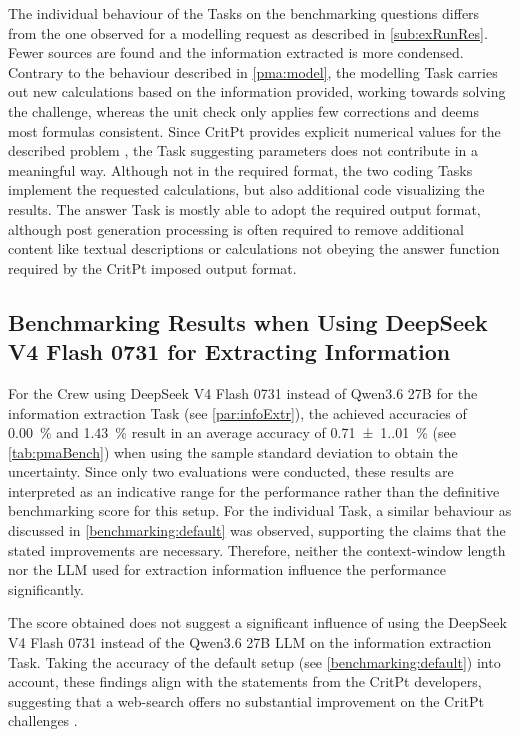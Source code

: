 \documentclass[
	fontsize = 11pt,
	paper = a4,
	draft = false,
	twoside = true,
	titlepage = false
]{scrartcl}
\numberwithin{equation}{subsection}
\begin{document}
	The individual behaviour of the Tasks on the benchmarking questions differs from the one observed for a modelling request as described in \autoref{sub:exRunRes}. Fewer sources are found and the information extracted is more condensed. Contrary to the behaviour described in \autoref{pma:model}, the modelling Task carries out new calculations based on the information provided, working towards solving the challenge, whereas the unit check only applies few corrections and deems most formulas consistent. Since CritPt provides explicit numerical values for the described problem \autocite{critptGit}, the Task suggesting parameters does not contribute in a meaningful way. Although not in the required format, the two coding Tasks implement the requested calculations, but also additional code visualizing the results. The answer Task is mostly able to adopt the required output format, although post generation processing is often required to remove additional content like textual descriptions or calculations not obeying the answer function required by the CritPt imposed output format.
	
	\subsection{Benchmarking Results when Using DeepSeek V4 Flash 0731 for Extracting Information} \label{benchmarking:deep1}
	For the Crew using DeepSeek V4 Flash 0731 instead of Qwen3.6 27B for the information extraction Task (see \autoref{par:infoExtr}), the achieved accuracies of \SI[round-mode=places, round-precision=2]{0.00}{\percent} and \SI[round-mode=places, round-precision=2]{1.43}{\percent} result in an average accuracy of \SI[round-mode=places, round-precision=2]{0.71(1.01)}{\percent} (see \autoref{tab:pmaBench}) when using the sample standard deviation to obtain the uncertainty. Since only two evaluations were conducted, these results are interpreted as an indicative range for the performance rather than the definitive benchmarking score for this setup. For the individual Task, a similar behaviour as discussed in \autoref{benchmarking:default} was observed, supporting the claims that the stated improvements are necessary. Therefore, neither the \gls{context-window} length nor the \gls{LLM} used for extraction information influence the performance significantly.
	
	The score obtained does not suggest a significant influence of using the DeepSeek V4 Flash 0731 instead of the Qwen3.6 27B \gls{LLM} on the information extraction Task. Taking the accuracy of the default setup (see \autoref{benchmarking:default}) into account, these findings align with the statements from the CritPt developers, suggesting that a web-search offers no substantial improvement on the CritPt challenges \autocite[p.~10]{critPtArx}.
	
\end{document}
